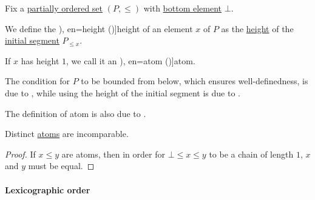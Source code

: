 \begin{definition}\label{def:partial_order_element_height}\mimprovised
  Fix a \hyperref[def:partially_ordered_set]{partially ordered set} \( (P, \leq) \) with \hyperref[def:extremal_points/top_and_bottom]{bottom element} \( \bot \).

  We define the \term[ru=высота (\cite[83]{Гуров2013Решётки}), en=height (\cite[5]{Birkhoff1967Lattices})]{height} of an element \( x \) of \( P \) as the \hyperref[def:partial_order_chain/height]{height} of the \hyperref[def:order_interval/unbounded]{initial segment} \( P_{\leq x} \).

  If \( x \) has height \( 1 \), we call it an \term[ru=атом (\cite[89]{Гуров2013Решётки}), en=atom (\cite[5]{Birkhoff1967Lattices})]{atom}.
\end{definition}
\begin{comments}
  \item The condition for \( P \) to be bounded from below, which ensures well-definedness, is due to , while using the height of the initial segment is due to .

  \item The definition of atom is also due to .
\end{comments}

\begin{proposition}\label{thm:atoms_are_incomparable}
  Distinct \hyperref[def:partial_order_element_height]{atoms} are incomparable.
\end{proposition}
\begin{proof}
  If \( x \leq y \) are atoms, then in order for \( \bot \leq x \leq y \) to be a chain of length \( 1 \), \( x \) and \( y \) must be equal.
\end{proof}

\paragraph{Lexicographic order}


